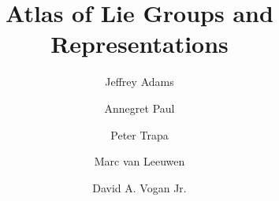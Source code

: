 \documentclass[letterpaper,10pt,oneside,onecolumn,openright,final]{amsbook}
\theoremstyle{definition}
\theoremstyle{remark}
\numberwithin{section}{chapter}
\numberwithin{equation}{chapter}
\begin{document}
\title{Atlas of Lie Groups and Representations}
\author{Jeffrey Adams}
\author{Annegret Paul}
\author{Peter Trapa}
\author{Marc van Leeuwen}
\author{David A. Vogan Jr.}

\frontmatter                            %
\maketitle                              %
\tableofcontents                        %
\mainmatter                             %
\backmatter
\maketitle
\end{document}
